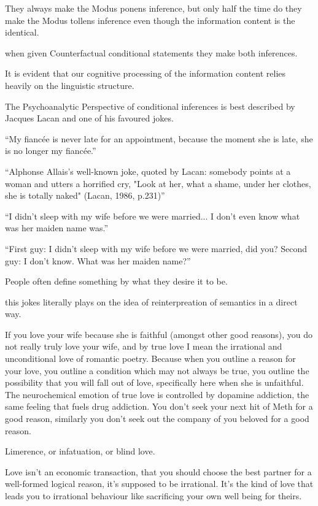 They always make the Modus ponens inference, but only half the time do they make the Modus tollens inference even though the information content is the identical. 

when given Counterfactual conditional statements they make both inferences.

It is evident that our cognitive processing of the information content relies heavily on the linguistic structure.

The Psychoanalytic Perspective of conditional inferences is best described by Jacques Lacan and one of his favoured jokes.

``My fiancée is never late for an appointment, because the moment she is late, she is no longer my fiancée.''

``Alphonse Allais's well-known joke, quoted by Lacan: somebody points at a woman and utters a horrified cry, "Look at her, what a shame, under her clothes, she is totally naked" (Lacan, 1986, p.231)''

``I didn't sleep with my wife before we were married... I don't even know what was her maiden name was.''

``First guy: I didn't sleep with my wife before we were married, did you? Second guy: I don't know. What was her maiden name?''

People often define something by what they desire it to be. 

this jokes literally plays on the idea of reinterpreation of semantics in a direct way.

If you love your wife because she is faithful (amongst other good reasons), you do not really truly love your wife, and by true love I mean the irrational and unconditional love of romantic poetry. Because when you outline a reason for your love, you outline a condition which may not always be true, you outline the possibility that you will fall out of love, specifically here when she is unfaithful. The neurochemical emotion of true love is controlled by dopamine addiction, the same feeling that fuels drug addiction. You don't seek your next hit of Meth for a good reason, similarly you don't seek out the company of you beloved for a good reason.

Limerence, or infatuation, or blind love.

Love isn't an economic transaction, that you should choose the best partner for a well-formed logical reason, it's supposed to be irrational. It's the kind of love that leads you to irrational behaviour like sacrificing your own well being for theirs.

